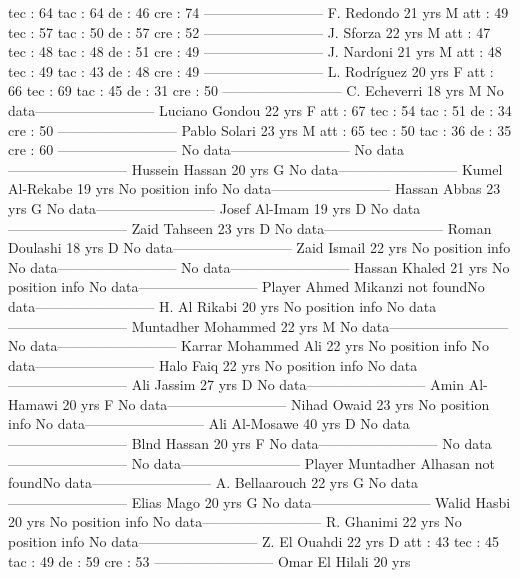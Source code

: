  tec : 64 
 tac : 64 
 de : 46 
 cre : 74 
--------------------------
F. Redondo  21 yrs 
M 
 att : 49 
 tec : 57 
 tac : 50 
 de : 57 
 cre : 52 
--------------------------
J. Sforza  22 yrs 
M 
 att : 47 
 tec : 48 
 tac : 48 
 de : 51 
 cre : 49 
--------------------------
J. Nardoni  21 yrs 
M 
 att : 48 
 tec : 49 
 tac : 43 
 de : 48 
 cre : 49 
--------------------------
L. Rodríguez  20 yrs 
F 
 att : 66 
 tec : 69 
 tac : 45 
 de : 31 
 cre : 50 
--------------------------
C. Echeverri  18 yrs 
M 
No data--------------------------
Luciano Gondou  22 yrs 
F 
 att : 67 
 tec : 54 
 tac : 51 
 de : 34 
 cre : 50 
--------------------------
Pablo Solari  23 yrs 
M 
 att : 65 
 tec : 50 
 tac : 36 
 de : 35 
 cre : 60 
--------------------------
No data--------------------------
No data--------------------------
Hussein Hassan  20 yrs 
G 
No data--------------------------
Kumel Al-Rekabe  19 yrs 
No position info 
No data--------------------------
Hassan Abbas  23 yrs 
G 
No data--------------------------
Josef Al-Imam  19 yrs 
D 
No data--------------------------
Zaid Tahseen  23 yrs 
D 
No data--------------------------
Roman Doulashi  18 yrs 
D 
No data--------------------------
Zaid Ismail  22 yrs 
No position info 
No data--------------------------
No data--------------------------
Hassan Khaled  21 yrs 
No position info 
No data--------------------------
Player Ahmed Mikanzi not foundNo data--------------------------
H. Al Rikabi  20 yrs 
No position info 
No data--------------------------
Muntadher Mohammed  22 yrs 
M 
No data--------------------------
No data--------------------------
Karrar Mohammed Ali  22 yrs 
No position info 
No data--------------------------
Halo Faiq  22 yrs 
No position info 
No data--------------------------
Ali Jassim  27 yrs 
D 
No data--------------------------
Amin Al-Hamawi  20 yrs 
F 
No data--------------------------
Nihad Owaid  23 yrs 
No position info 
No data--------------------------
Ali Al-Mosawe  40 yrs 
D 
No data--------------------------
Blnd Hassan  20 yrs 
F 
No data--------------------------
No data--------------------------
No data--------------------------
Player Muntadher Alhasan not foundNo data--------------------------
A. Bellaarouch  22 yrs 
G 
No data--------------------------
Elias Mago  20 yrs 
G 
No data--------------------------
Walid Hasbi  20 yrs 
No position info 
No data--------------------------
R. Ghanimi  22 yrs 
No position info 
No data--------------------------
Z. El Ouahdi  22 yrs 
D 
 att : 43 
 tec : 45 
 tac : 49 
 de : 59 
 cre : 53 
--------------------------
Omar El Hilali  20 yrs 
